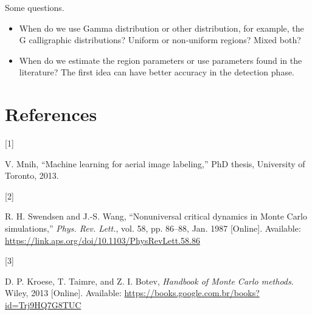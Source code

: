 \documentclass[
  journal,
]{IEEEtran}%
\newlength{\cslhangindent}
\newlength{\csllabelwidth}
\newenvironment{CSLReferences}[2] %
 {\begin{list}{}{%
  \setlength{\itemindent}{0pt}
  \setlength{\leftmargin}{0pt}
  \setlength{\parsep}{0pt}
  \ifodd #1
   \setlength{\leftmargin}{\cslhangindent}
   \setlength{\itemindent}{-1\cslhangindent}
  \fi
  \setlength{\itemsep}{#2\baselineskip}}}
 {\end{list}}
\newcommand{\CSLLeftMargin}[1]{\parbox[t]{\csllabelwidth}{\strut#1\strut}}
\newcommand{\CSLRightInline}[1]{\parbox[t]{\linewidth - \csllabelwidth}{\strut#1\strut}}
\begin{document}
Some questions.

\begin{itemize}
\item When do we use Gamma distribution or other distribution, for example, the G calligraphic distributions? Uniform or non-uniform regions? Mixed both?
\item When do we estimate the region parameters or use parameters found in the literature? The first idea can have better accuracy in the detection phase.
\end{itemize}

\begin{figure}


\caption{\label{fig-6}}

\end{figure}%

\section*{References}\label{references}

\label{refs}
\begin{CSLReferences}{0}{0}
\CSLLeftMargin{{[}1{]} }%
\CSLRightInline{V. Mnih, {``Machine learning for aerial image
labeling,''} PhD thesis, University of Toronto, 2013. }

\CSLLeftMargin{{[}2{]} }%
\CSLRightInline{R. H. Swendsen and J.-S. Wang, {``Nonuniversal critical
dynamics in {M}onte {C}arlo simulations,''} \emph{Phys. Rev. Lett.},
vol. 58, pp. 86--88, Jan. 1987 {[}Online{]}. Available:
\url{https://link.aps.org/doi/10.1103/PhysRevLett.58.86}}

\CSLLeftMargin{{[}3{]} }%
\CSLRightInline{D. P. Kroese, T. Taimre, and Z. I. Botev, \emph{Handbook
of {M}onte {C}arlo methods}. Wiley, 2013 {[}Online{]}. Available:
\url{https://books.google.com.br/books?id=Trj9HQ7G8TUC}}

\end{CSLReferences}
\end{document}
